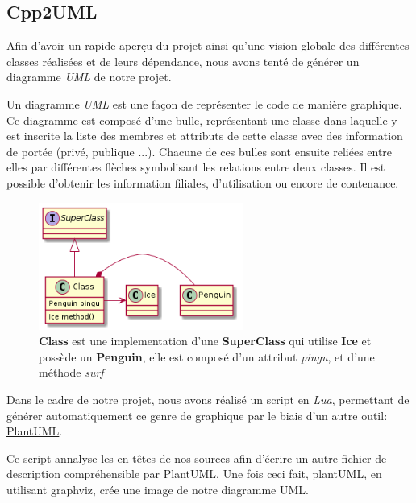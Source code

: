 \subsection{Cpp2UML}

Afin d'avoir un rapide aperçu du projet ainsi qu'une vision globale des différentes classes réalisées et de leurs dépendance,
nous avons tenté de générer un diagramme \textit{UML} de notre projet.

Un diagramme \textit{UML} est une façon de représenter le code de manière graphique.
Ce diagramme est composé d'une bulle, représentant une classe dans laquelle y est inscrite la liste des membres et attributs de cette classe avec des information de portée (privé, publique ...).
Chacune de ces bulles sont ensuite reliées entre elles par différentes flèches symbolisant les relations entre deux classes. Il est possible d'obtenir les information filiales, d'utilisation ou encore de contenance.

\begin{figure}[h!]
	\centering
	\includegraphics[width=0.6\textwidth]{img/uml_example.png}
	\caption{\textbf{Class} est une implementation d'une \textbf{SuperClass} qui utilise \textbf{Ice} et possède un \textbf{Penguin}, elle est composé d'un attribut \textit{pingu}, et d'une méthode \textit{surf}}
\end{figure}

Dans le cadre de notre projet, nous avons réalisé un script en \textit{Lua},
permettant de générer automatiquement ce genre de graphique par le biais d'un autre outil:
\href{http://plantuml.sourceforge.net/}{PlantUML}.

Ce script annalyse les en-têtes de nos sources afin d'écrire un autre fichier de description compréhensible par PlantUML. Une fois ceci fait,  plantUML, en utilisant graphviz, crée une image de notre diagramme UML.
